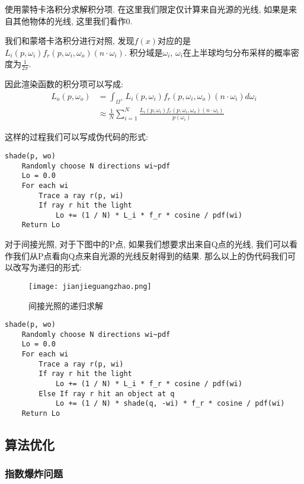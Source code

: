 使用蒙特卡洛积分求解积分项. 在这里我们限定仅计算来自光源的光线, 如果是来自其他物体的光线, 这里我们看作0.

我们和蒙塔卡洛积分进行对照, 发现$f(x)$对应的是$L_i(p,\omega_i)f_r(p,\omega_i,\omega_o)(n\cdot \omega_i)$. 积分域是$\omega_i$, $\omega_i$在上半球均匀分布采样的概率密度为$\frac{1}{2\pi}$. 

因此渲染函数的积分项可以写成: 
\begin{equation}
	\begin{split}
		L_o(p,\omega_o)&=\int_{\Omega^+}L_i(p,\omega_i)f_r(p,\omega_i,\omega_o)(n\cdot \omega_i)d\omega_i\\
		&\approx \frac{1}{N}\sum_{i=1}^{N}\frac{L_i(p,\omega_i)f_r(p,\omega_i,\omega_o)(n\cdot \omega_i)}{p(\omega_i)}
	\end{split}
\end{equation}

这样的过程我们可以写成伪代码的形式: 
\begin{lstlisting}[caption=渲染函数积分项对光源光线求解伪代码]
shade(p, wo)
	Randomly choose N directions wi~pdf
	Lo = 0.0
	For each wi
		Trace a ray r(p, wi)
		If ray r hit the light
			Lo += (1 / N) * L_i * f_r * cosine / pdf(wi)
	Return Lo
\end{lstlisting}

对于间接光照, 对于下图中的P点, 如果我们想要求出来自Q点的光线, 我们可以看作我们从P点看向Q点来自光源的光线反射得到的结果. 那么以上的伪代码我们可以改写为递归的形式: 


\begin{figure}[H]
	\centering
	\texttt{[image: jianjieguangzhao.png]}
	\caption{间接光照的递归求解}
	\label{fig:jjgz}
\end{figure}

\begin{lstlisting}[caption=渲染函数积分项的递归求解伪代码]
shade(p, wo)
	Randomly choose N directions wi~pdf
	Lo = 0.0
	For each wi
		Trace a ray r(p, wi)
		If ray r hit the light
			Lo += (1 / N) * L_i * f_r * cosine / pdf(wi)
		Else If ray r hit an object at q
			Lo += (1 / N) * shade(q, -wi) * f_r * cosine / pdf(wi)
	Return Lo
\end{lstlisting}

\subsection{算法优化}

\subsubsection{指数爆炸问题}

